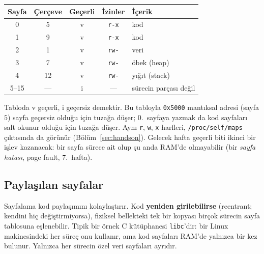 \documentclass[11pt,a4paper]{article}
\newcommand{\term}[1]{\textbf{\color{mintdeep}#1}}
\begin{document}
\begin{center}
\renewcommand{\arraystretch}{1.2}
\begin{tabular}{@{}ccccl@{}}
\toprule
\textbf{Sayfa} & \textbf{Çerçeve} & \textbf{Geçerli} & \textbf{İzinler} & \textbf{İçerik} \\
\midrule
0 & 5 & v & \texttt{r-x} & kod \\
1 & 9 & v & \texttt{r-x} & kod \\
2 & 1 & v & \texttt{rw-} & veri \\
3 & 7 & v & \texttt{rw-} & öbek (heap) \\
4 & 12 & v & \texttt{rw-} & yığıt (stack) \\
5--15 & --- & i & --- & sürecin parçası değil \\
\bottomrule
\end{tabular}
\end{center}

Tabloda v geçerli, i geçersiz demektir. Bu tabloyla \texttt{0x5000} mantıksal adresi (sayfa $5$) sayfa geçersiz olduğu için tuzağa düşer; $0$.~sayfaya yazmak da kod sayfaları salt okunur olduğu için tuzağa düşer. Aynı \texttt{r}, \texttt{w}, \texttt{x} harfleri, \texttt{/proc/self/maps} çıktısında da görünür (Bölüm~\ref{sec:handson}). Gelecek hafta geçerli biti ikinci bir işlev kazanacak: bir sayfa sürece ait olup şu anda RAM'de olmayabilir (bir \emph{sayfa hatası}, page fault, 7.~hafta).

\subsection{Paylaşılan sayfalar}

Sayfalama kod paylaşımını kolaylaştırır. Kod \term{yeniden girilebilirse} (reentrant; kendini hiç değiştirmiyorsa), fiziksel bellekteki tek bir kopyası birçok sürecin sayfa tablosuna eşlenebilir. Tipik bir örnek C kütüphanesi \texttt{libc}'dir: bir Linux makinesindeki her süreç onu kullanır, ama kod sayfaları RAM'de yalnızca bir kez bulunur. Yalnızca her sürecin özel veri sayfaları ayrıdır.
\end{document}
